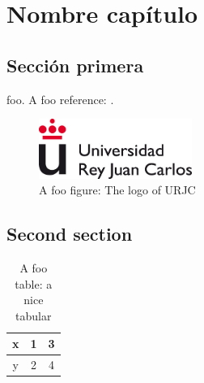 \chapter{Nombre capítulo}
    \section{Sección primera}

        foo. A foo reference: \cite{Maggie2006}.

        \begin{figure}[ht!]
            \centering
            \includegraphics[width=5cm]{images/logourjc.jpg}
            \caption{A foo figure: The logo of URJC}
            \label{fig:uc3m_logo}
        \end{figure}


        \section{Second section}

        \begin{table}
            \begin{center}
                \begin{tabular}{c | cc}
                x & 1 & 3\\ \hline
                y & 2 & 4\\
                \end{tabular}
            \end{center}
            \caption{A foo table: a nice tabular}
        \end{table} 
